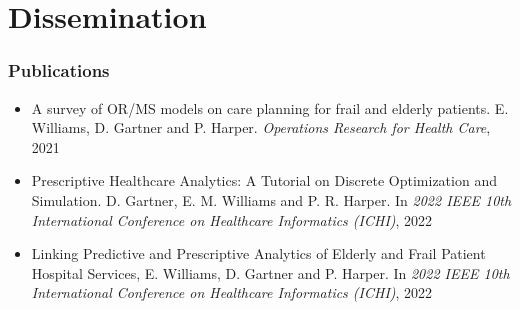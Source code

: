 \documentclass[../thesis.tex]{subfiles}
\begin{document}
\newpage
\thispagestyle{empty}
\chapter*{Dissemination}

\subsection*{Publications}
\begin{itemize}
    \item A survey of OR/MS models on care planning for frail and elderly patients. E. Williams, D. Gartner and P. Harper. \textit{Operations Research for Health Care}, 2021 \cite{Williams2021}
    \item Prescriptive Healthcare Analytics: A Tutorial on Discrete Optimization and Simulation. D. Gartner, E. M. Williams and P. R. Harper. In \textit{2022 IEEE 10th International Conference on Healthcare Informatics (ICHI)}, 2022 \cite{Gartner2022}
    \item Linking Predictive and Prescriptive Analytics of Elderly and Frail Patient Hospital Services, E. Williams, D. Gartner and P. Harper. In \textit{2022 IEEE 10th International Conference on Healthcare Informatics (ICHI)}, 2022 \cite{Williams2022}
\end{itemize}
\end{document}
